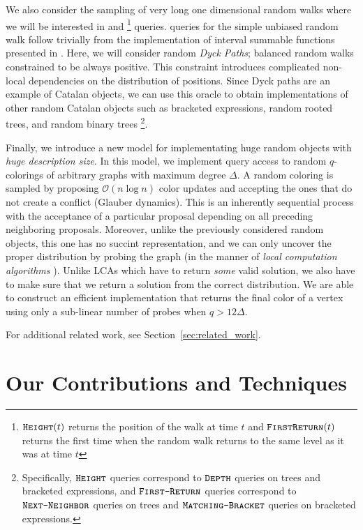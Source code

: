 We also consider the sampling of very long one dimensional random walks where we will be interested in  and 
\footnote{$\texttt{\textsc{Height}}(t)$ returns the position of the walk at time $t$
and $\texttt{\textsc{FirstReturn}}(t)$ returns the first time when the random walk returns to the same level as it was at time $t$} queries.
 queries for the simple unbiased random walk follow trivially from the implementation of interval summable functions presented in \cite{huge}.
Here, we will consider random \emph{Dyck Paths}; balanced random walks constrained to be always positive.
This constraint introduces complicated non-local dependencies on the distribution of positions.
Since Dyck paths are an example of Catalan objects, we can use this oracle to obtain implementations of other random Catalan objects
such as bracketed expressions, random rooted trees, and random binary trees
\footnote{Specifically, $\texttt{\textsc{Height}}$ queries correspond to $\texttt{\textsc{Depth}}$ queries on trees and bracketed expressions,
and $\texttt{\textsc{First-Return}}$ queries correspond to $\texttt{\textsc{Next-Neighbor}}$ queries on trees and $\texttt{\textsc{Matching-Bracket}}$ queries on bracketed expressions.
}.

Finally, we introduce a new model for implementating huge random objects with \emph{huge description size}.
In this model, we implement query access to random $q$-colorings of arbitrary graphs with maximum degree $\Delta$.
A random coloring is sampled by proposing $\mathcal O(n\log n)$ color updates and accepting the ones that do not create a conflict (Glauber dynamics).
This is an inherently sequential process with the acceptance of a particular proposal depending on all preceding neighboring proposals.
Moreover, unlike the previously considered random objects, this one has no succint representation,
and we can only uncover the proper distribution by probing the graph (in the manner of \emph{local computation algorithms} \cite{LCA}).
Unlike LCAs which have to return \emph{some} valid solution, we also have to make sure that we return a solution from the correct distribution.
We are able to construct an efficient implementation that returns the final color of a vertex using only a sub-linear number of probes when $q>12\Delta$.

For additional related work, see Section~\ref{sec:related_work}.




\section{Our Contributions and Techniques}

